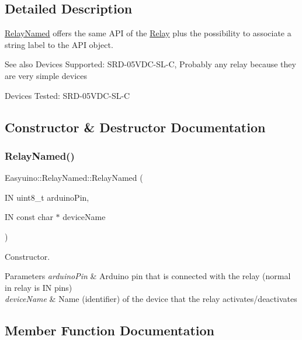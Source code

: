 \subsection{Detailed Description}
\hyperlink{class_easyuino_1_1_relay_named}{Relay\+Named} offers the same A\+PI of the \hyperlink{class_easyuino_1_1_relay}{Relay} plus the possibility to associate a string label to the A\+PI object. 

\begin{DoxySeeAlso}{See also}
Devices Supported\+: S\+R\+D-\/05\+V\+D\+C-\/\+S\+L-\/C, Probably any relay because they are very simple devices 

Devices Tested\+: S\+R\+D-\/05\+V\+D\+C-\/\+S\+L-\/C 
\end{DoxySeeAlso}


\subsection{Constructor \& Destructor Documentation}
\mbox{\label{class_easyuino_1_1_relay_named_a3def4eb321085beb48fa3e45da5e6dfc}} 
\subsubsection{\texorpdfstring{Relay\+Named()}{RelayNamed()}}
{\footnotesize\ttfamily Easyuino\+::\+Relay\+Named\+::\+Relay\+Named (\begin{DoxyParamCaption}\item[{IN uint8\+\_\+t}]{arduino\+Pin,  }\item[{IN const char $\ast$}]{device\+Name }\end{DoxyParamCaption})}



Constructor. 


\begin{DoxyParams}{Parameters}
{\em arduino\+Pin} & Arduino pin that is connected with the relay (normal in relay is IN pins) \\
\hline
{\em device\+Name} & Name (identifier) of the device that the relay activates/deactivates \\
\hline
\end{DoxyParams}


\subsection{Member Function Documentation}
\mbox{\label{class_easyuino_1_1_relay_named_a1e9e82e563baaba5055ee9335551a306}} 
